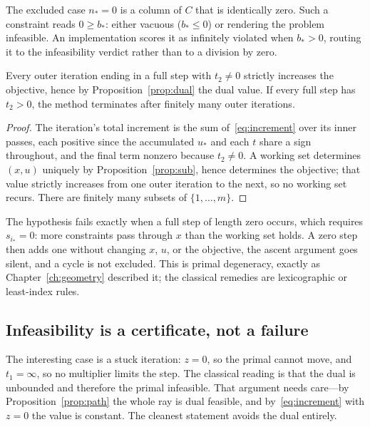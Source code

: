 The excluded case $n_* = 0$ is a column of $C$ that is identically zero. Such a
constraint reads $0 \ge b_*$: either vacuous ($b_* \le 0$) or rendering the problem
infeasible. An implementation scores it as infinitely violated when $b_* > 0$,
routing it to the infeasibility verdict rather than to a division by zero.

\begin{proposition}
\label{prop:ascent}
Every outer iteration ending in a full step with $t_2 \ne 0$ strictly increases the
objective, hence by Proposition~\ref{prop:dual} the dual value. If every full step
has $t_2 > 0$, the method terminates after finitely many outer iterations.
\end{proposition}

\begin{proof}
The iteration's total increment is the sum of~\eqref{eq:increment} over its inner
passes, each positive since the accumulated $u_*$ and each $t$ share a sign
throughout, and the final term nonzero because $t_2 \ne 0$. A working set
determines $(x,u)$ uniquely by Proposition~\ref{prop:sub}, hence determines the
objective; that value strictly increases from one outer iteration to the next, so
no working set recurs. There are finitely many subsets of $\{1,\dots,m\}$.
\end{proof}

\begin{remark}[Degeneracy]
\label{rem:degeneracy}
The hypothesis fails exactly when a full step of length zero occurs, which requires
$s_{i_*} = 0$: more constraints pass through $x$ than the working set holds. A zero
step then adds one without changing $x$, $u$, or the objective, the ascent argument
goes silent, and a cycle is not excluded. This is primal degeneracy, exactly as
Chapter~\ref{ch:geometry} described it; the classical remedies are lexicographic or
least-index rules.
\end{remark}

\subsection{Infeasibility is a certificate, not a failure}

The interesting case is a stuck iteration: $z = 0$, so the primal cannot move, and
$t_1 = \infty$, so no multiplier limits the step. The classical reading is that the
dual is unbounded and therefore the primal infeasible. That argument needs care---by
Proposition~\ref{prop:path} the whole ray is dual feasible, and
by~\eqref{eq:increment} with $z = 0$ the value is constant. The cleanest statement
avoids the dual entirely.

